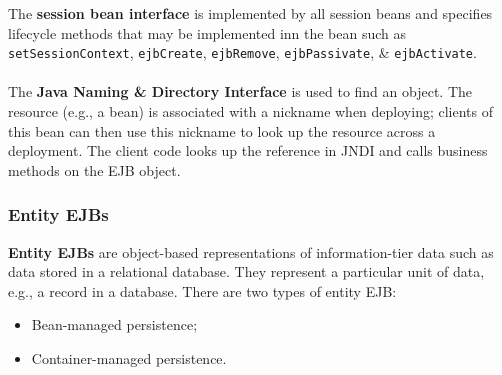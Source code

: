 \documentclass[a4paper,11pt]{article}
\begin{document}
The \textbf{session bean interface} is implemented by all session beans and specifies lifecycle methods that may be implemented inn the bean such as \texttt{setSessionContext}, \texttt{ejbCreate}, \texttt{ejbRemove}, \texttt{ejbPassivate}, \& \texttt{ejbActivate}.
\\\\
The \textbf{Java Naming \& Directory Interface} is used to find an object.
The resource (e.g., a bean) is associated with a nickname when deploying; clients of this bean can then use this nickname to look up the resource across a deployment.
The client code looks up the reference in JNDI and calls business methods on the EJB object.

\subsubsection{Entity EJBs}
\textbf{Entity EJBs} are object-based representations of information-tier data such as data stored in a relational database.
They represent a particular unit of data, e.g., a record in a database.
There are two types of entity EJB:
\begin{itemize}
    \item   Bean-managed persistence;
    \item   Container-managed persistence.
\end{itemize}
\end{document}
